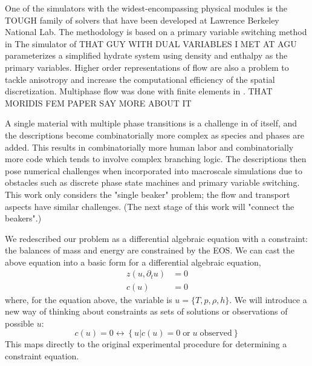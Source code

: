 \documentclass[AMA,STIX1COL]{WileyNJD-v2}
\begin{document}
One of the simulators with the widest-encompassing physical modules is
the TOUGH family of solvers that have been developed at Lawrence
Berkeley National Lab.
The methodology is based on a primary variable switching method in 
The simulator of THAT GUY WITH DUAL VARIABLES I MET AT AGU
parameterizes a simplified hydrate system using density and enthalpy
as the primary variables.
Higher order representations of flow are also a problem to tackle
anisotropy and increase the computational efficiency of the spatial
discretization\cite{hannon_enhanced_2018}. 
Multiphase flow was done with finite elements in \cite{yang_fully_2014}.
THAT MORIDIS FEM PAPER SAY MORE ABOUT IT


A single material with multiple phase transitions
is a challenge in of itself, and the descriptions become combinatorially
more complex as species and phases are added. This results in
combinatorially more human labor and combinatorially more code which
tends to involve complex branching logic. The descriptions then pose
numerical challenges when incorporated into macroscale simulations due
to obstacles such as discrete phase state machines and primary variable
switching.
This work only considers the "single beaker" problem; the flow
and transport aspects have similar challenges. (The next stage of this
work will "connect the beakers".)


We redescribed our problem as a differential algebraic equation
with a constraint: the balances of mass and energy are constrained by
the EOS. We can cast the above equation into a basic form for a
differential algebraic equation,
\begin{align}
  z( u, \partial_t u) &= 0 \\
  c(u) & = 0
\end{align}
where, for the equation above, the variable is $u=\{T,p,\rho,h\}$. We will introduce a new way of thinking about constraints as sets of
solutions or observations of possible $u$:
\begin{equation}
c(u)=0 \longleftrightarrow \left\{ u | c(u)=0 \;\text{or}\; u\; \text{observed} \right\}
\end{equation}
This maps directly to the original experimental procedure for
determining a constraint equation.
\end{document}
